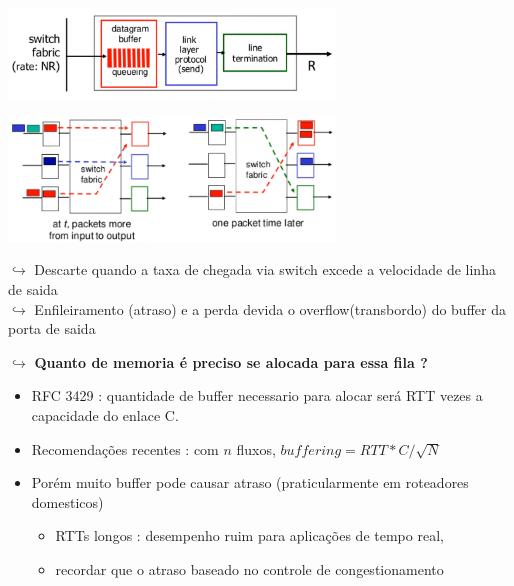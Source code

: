 \begin{itemize}[left=0.5cm, align=left, nosep]
                    \begin{center}
                        \includegraphics[width=0.65\textwidth]{img/cap-04/enfileiramento-interface-saida.png}
                    \end{center}

                    \begin{center}
                        \includegraphics[width=0.65\textwidth]{img/cap-04/enfileiramento-interface-saida2.png}
                    \end{center}

                    $\hookrightarrow$ Descarte quando a taxa de chegada via switch excede a velocidade de linha de saida \\
                    $\hookrightarrow$ Enfileiramento (atraso) e a perda devida o overflow(transbordo) do buffer da porta de saida

                    $\hookrightarrow$ \textbf{Quanto de memoria é preciso se alocada para essa fila ?}
                        \begin{itemize}[left=0.5cm, align=left, nosep]
                            \item RFC 3429 : quantidade de buffer necessario para alocar será RTT vezes a capacidade do enlace C.
                            \item Recomendações recentes : com $n$ fluxos, $buffering = RTT * C / \sqrt{N}$
                            \item Porém muito buffer pode causar atraso (praticularmente em roteadores domesticos)
                            \begin{itemize}[left=0.5cm, align=left, nosep]
                                \item RTTs longos : desempenho ruim para aplicações de tempo real,
                                \item recordar que o atraso baseado no controle de congestionamento  
                            \end{itemize}
                        \end{itemize}
    

\end{itemize}
